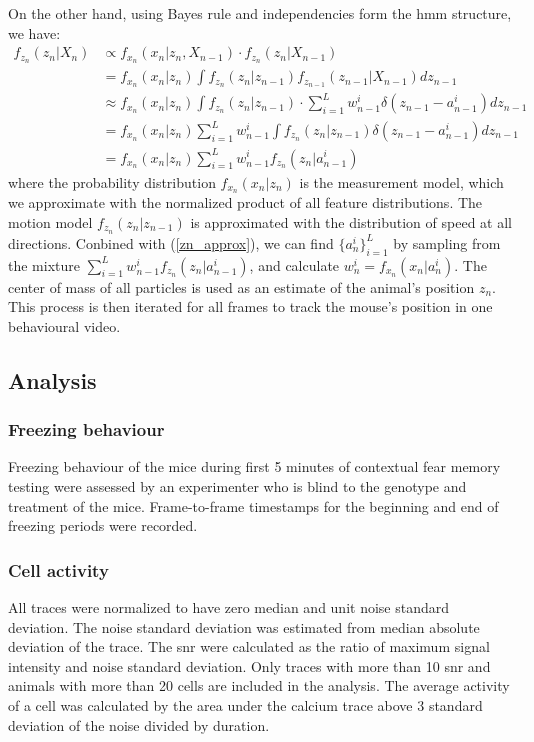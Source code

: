 On the other hand, using Bayes rule and independencies form the \gls{hmm} structure, we have:
\begin{align*}
    f_{z_n}(z_n|X_n) &\propto f_{x_n}(x_n|z_n, X_{n-1}) \cdot f_{z_n}(z_n|X_{n-1}) \\
                     &= f_{x_n}(x_n|z_n) \int f_{z_n}(z_n|z_{n-1})f_{z_{n-1}}(z_{n-1}|X_{n-1})dz_{n-1}  \\
                     &\approx f_{x_n}(x_n|z_n) \int f_{z_n}(z_n|z_{n-1})\cdot \sum_{i=1}^Lw_{n-1}^i\delta(z_{n-1}-a_{n-1}^i)dz_{n-1} \\
                     &= f_{x_n}(x_n|z_n)  \sum_{i=1}^Lw_{n-1}^i \int f_{z_n}(z_n|z_{n-1})\delta(z_{n-1} - a_{n-1}^i)dz_{n-1} \\
                     &= f_{x_n}(x_n|z_n) \sum_{i=1}^Lw_{n-1}^if_{z_n}(z_n|a_{n-1}^i) 
\end{align*}
where the probability distribution $f_{x_n}(x_n|z_n)$ is the measurement model, which we approximate with the normalized product of all feature distributions. The motion model $f_{z_n}(z_n|z_{n-1})$ is approximated with the distribution of speed at all directions. Conbined with (\ref{zn_approx}), we can find $\{a_n^i\}_{i=1}^L$ by sampling from the mixture $\sum_{i=1}^Lw_{n-1}^if_{z_n}(z_n|a_{n-1}^i)$, and calculate $w_n^i = f_{x_n}(x_n|a_n^i)$. The center of mass of all particles is used as an estimate of the animal's position $z_n$. This process is then iterated for all frames to track the mouse's position in one behavioural video.

\subsection{Analysis}

\subsubsection{Freezing behaviour}
Freezing behaviour of the mice during first 5 minutes of contextual fear memory testing were assessed by an experimenter who is blind to the genotype and treatment of the mice. Frame-to-frame timestamps for the beginning and end of freezing periods were recorded.

\subsubsection{Cell activity}

All traces were normalized to have zero median and unit noise standard deviation. The noise standard deviation was estimated from median absolute deviation of the trace. The \gls{snr} were calculated as the ratio of maximum signal intensity and noise standard deviation. Only traces with more than 10 \gls{snr} and animals with more than 20 cells are included in the analysis. The average activity of a cell was calculated by the area under the calcium trace above 3 standard deviation of the noise divided by duration.

